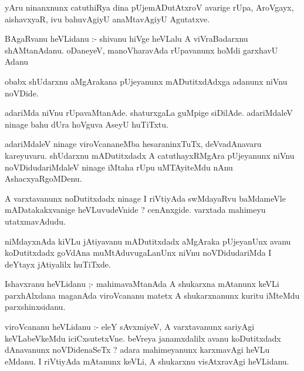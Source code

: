 \documentclass{article}
\begin{document}
\begin{mn}
yAru  ninanxnunx  catuthiRya  dina  pUjemADutAtxroV  avarige  rUpa,  AroVgayx,  aishavxyaR,  
ivu  bahuvAgiyU  anaMtavAgiyU  Agutatxve.
\end{mn}

\begin{mn}
BAgaRvanu  heVLidanu :- shivanu  hiVge  heVLalu  A  viVraBadarxnu  shAMtanAdanu.  oDaneyeV,  
manoVharavAda  rUpavanunx  hoMdi  garxhavU  Adanu
\end{mn}

\begin{mn}
obabx  shUdarxnu  aMgArakana  pUjeyanunx  mADutitxdAdxga  adanunx  niVnu  noVDide.
\end{mn}

\begin{mn}
adariMda  niVnu  rUpavaMtanAde.  shaturxgaLa  guMpige  siDilAde.  adariMdaleV  ninage  
bahu  dUra  hoVguva  AseyU  huTiTxtu.
\end{mn}

\begin{mn}
adariMdaleV  ninage  viroVcananeMba  hesaraninxTuTx,  deVvadAnavaru  kareyuvaru.  shUdarxnu  mADutitxdadx  A  
catuthayxRMgAra  pUjeyanunx  niVnu  noVDidudariMdaleV  ninage  iMtaha  rUpu  uMTAyiteMdu  nAnu  AshacxyaRgoMDenu.
\end{mn}

\begin{mn}
A  varxtavanunx  noDutitxdadx  ninage  I  riVtiyAda  swMdayaRvu  baMdameVle  mADatakakxvanige  
heVLuvudeVnide ?  cenAnxgide.  varxtada  mahimeyu  utatxmavAdudu.
\end{mn}

\begin{mn}
niMdayxnAda  kiVLu  jAtiyavanu  mADutitxdadx  aMgAraka  pUjeyanUnx  avanu  koDutitxdadx  
goVdAna  muMtAduvugaLanUnx  niVnu  noVDidudariMda  I  deYtayx  jAtiyalilx  huTiTxde.
\end{mn}

\begin{mn}
Ishavxranu  heVLidanu ;- mahimavaMtanAda  A  shukarxna  mAtanunx  keVLi  parxhAlxdana  
maganAda  viroVcananu  matetx  A  shukarxnanunx  kuritu  iMteMdu  parxshinxsidanu.
\end{mn}

\begin{mn}
viroVcananu    heVLidanu :- eleY  sAvxmiyeV,  A  varxtavanunx  sariyAgi  keVLabeVkeMdu  iciCxsutetxVne.  
beVreya  janamxdalilx  avanu  koDutitxdadx  dAnavanunx  noVDidenaSeTx ?  adara  mahimeyanunx  karxmavAgi  
heVLu  eMdanu.  I  riVtiyAda  mAtanunx  keVLi, A  shukarxnu  visAtxravAgi  heVLidanu.
\end{mn}
\end{document}
